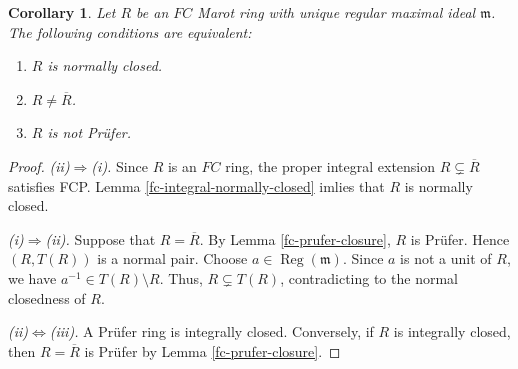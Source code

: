 \documentclass[12pt]{article}
\newtheorem{corollary}{Corollary}
\newcommand{\Reg}{\operatorname{Reg}}
\begin{document}
	\begin{corollary}\label{fc-normally-closed-characterization}
		Let $R$ be an $FC$ Marot ring with unique regular maximal ideal $\mathfrak m$. The following conditions are equivalent:
		\begin{enumerate}[label=(\roman*)]
			\item $R$ is normally closed.
			\item $R\neq\overline R$.
			\item $R$ is not Prüfer.
		\end{enumerate}
	\end{corollary}

	\begin{proof}
		\emph{(ii)$\Rightarrow$(i).} Since $R$ is an $FC$ ring, the proper integral extension $R\subsetneq\overline R$ satisfies FCP. Lemma \ref{fc-integral-normally-closed} imlies that $R$ is normally closed. 
	
		\emph{(i)$\Rightarrow$(ii).} Suppose that $R=\overline R$. By Lemma \ref{fc-prufer-closure}, $R$ is Prüfer. Hence $(R,T(R))$ is a normal pair. Choose $a\in\Reg(\mathfrak m)$. Since $a$ is not a unit of $R$, we have $a^{-1}\in T(R)\setminus R$. Thus, $R\subsetneq T(R)$, contradicting to the normal closedness of $R$.
	
		\emph{(ii)$\Leftrightarrow$(iii).} A Prüfer ring is integrally closed. Conversely, if $R$ is integrally closed, then $R=\overline R$ is Prüfer by Lemma \ref{fc-prufer-closure}.
	\end{proof}
\end{document}
